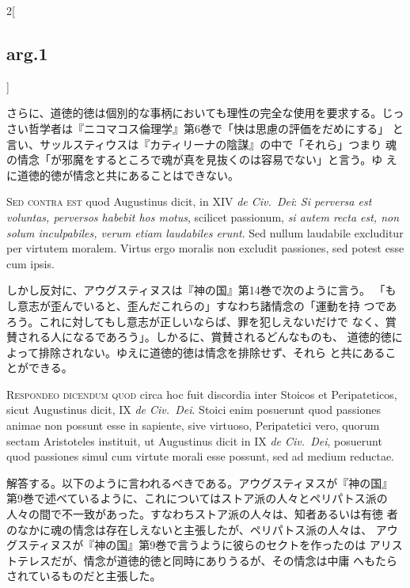 \documentclass[paper=a4paper,fontsize=10pt,jafontsize=9pt,titlepage]{jlreq}
\begin{document}
\begin{paracol}{2}[\subsection{arg.1}]
\switchcolumn

さらに、道徳的徳は個別的な事柄においても理性の完全な使用を要求する。じっ
さい哲学者は『ニコマコス倫理学』第6巻で「快は思慮の評価をだめにする」
と言い、サッルスティウスは『カティリーナの陰謀』の中で「それら」つまり
魂の情念「が邪魔をするところで魂が真を見抜くのは容易でない」と言う。ゆ
えに道徳的徳が情念と共にあることはできない。

\switchcolumn*[\subsection{s.c.}]

{\scshape Sed contra est} quod Augustinus dicit, in XIV {\itshape de
Civ.~Dei}: {\itshape Si perversa est voluntas, perversos habebit hos
motus}, scilicet passionum, {\itshape si autem recta est, non solum
inculpabiles, verum etiam laudabiles erunt}. Sed nullum laudabile
excluditur per virtutem moralem. Virtus ergo moralis non excludit
passiones, sed potest esse cum ipsis.

\switchcolumn

しかし反対に、アウグスティヌスは『神の国』第14巻で次のように言う。
 「もし意志が歪んでいると、歪んだこれらの」すなわち諸情念の「運動を持
 つであろう。これに対してもし意志が正しいならば、罪を犯しえないだけで
 なく、賞賛される人になるであろう」。しかるに、賞賛されるどんなものも、
 道徳的徳によって排除されない。ゆえに道徳的徳は情念を排除せず、それら
 と共にあることができる。


{\scshape Respondeo dicendum quod} circa hoc fuit discordia inter
 Stoicos et Peripateticos, sicut Augustinus dicit, IX {\itshape de
 Civ.~Dei}. Stoici enim posuerunt quod passiones animae non possunt
 esse in sapiente, sive virtuoso, Peripatetici vero, quorum sectam
 Aristoteles instituit, ut Augustinus dicit in IX {\itshape de
 Civ.~Dei}, posuerunt quod passiones simul cum virtute morali esse
 possunt, sed ad medium reductae.

\switchcolumn

解答する。以下のように言われるべきである。アウグスティヌスが『神の国』
 第9巻で述べているように、これについてはストア派の人々とペリパトス派の
 人々の間で不一致があった。すなわちストア派の人々は、知者あるいは有徳
 者のなかに魂の情念は存在しえないと主張したが、ペリパトス派の人々は、
 アウグスティヌスが『神の国』第9巻で言うように彼らのセクトを作ったのは
 アリストテレスだが、情念が道徳的徳と同時にありうるが、その情念は中庸
 へもたらされているものだと主張した。


\end{paracol}
\end{document}
